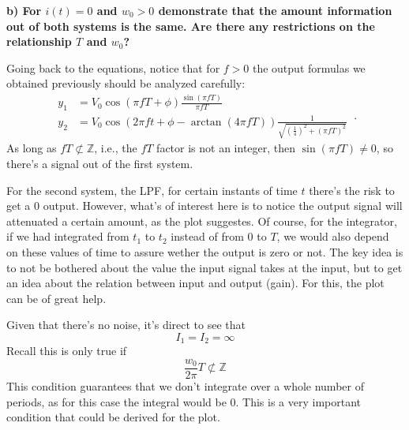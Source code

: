 \begin{pexbox}{}
    \textbf{b) For $i(t) = 0$ and $w_0 > 0$ demonstrate that the amount information out of both systems is the same. Are there any restrictions on the relationship $T$ and $w_0$?}
\end{pexbox}

\noindent Going back to the equations, notice that for $f>0$ the output formulas we obtained previously should be analyzed carefully: %
\begin{equation}
   \begin{split}
   y_1 &=  V_0 \cos(\pi f T + \phi) \frac{\sin(\pi f T)}{\pi f T} \\
   y_2 &=  V_0 \cos \left(  2 \pi f t + \phi - \arctan \left( 4 \pi f T \right) \right) \frac{1}{\sqrt{ \left(\frac{1}{4} \right)^2 + (\pi f T)^2}} 
   \end{split} \ .
\end{equation}
\noindent As long as $f T \not\subset \mathbb{Z} $, i.e., the $fT$ factor is not an integer, then $\sin(\pi f T) \neq 0$, so there's a signal out of the first system.

\noindent For the second system, the LPF, for certain instants of time $t$ there's the risk to get a $0$ output. However, what's of interest here is to notice the output signal will attenuated a certain amount, as the plot suggestes. Of course, for the integrator, if we had integrated from $t_1$ to $t_2$ instead of from $0$ to $T$, we would also depend on these values of time to assure wether the output is zero or not. The key idea is to not be bothered about the value the input signal takes at the input, but to get an idea about the relation between input and output (gain). For this, the plot can be of great help.  %

\noindent Given that there's no noise, it's direct to see that
\begin{equation}
   \boxed{
      I_1 = I_2 = \infty
   } 
\end{equation}
\noindent Recall this is only true if
\begin{equation}
   \boxed{
      \frac{w_0}{2 \pi} T \not\subset \mathbb{Z}
   }
\end{equation}
\noindent This condition guarantees that we don't integrate over a whole number of periods, as for this case the integral would be $0$. This is a very important condition that could be derived for the plot. 

